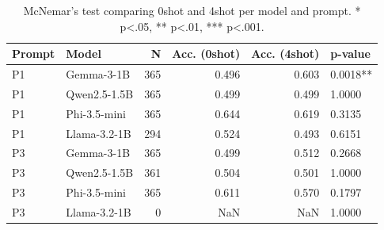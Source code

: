 \begin{table}
\caption{McNemar's test comparing 0shot and 4shot per model and prompt. * p<.05, ** p<.01, *** p<.001.}
\label{tab:mcnemar}
\begin{tabular}{llrrrl}
\toprule
Prompt & Model & N & Acc. (0shot) & Acc. (4shot) & p-value \\
\midrule
P1 & Gemma-3-1B & 365 & 0.496 & 0.603 & 0.0018** \\
P1 & Qwen2.5-1.5B & 365 & 0.499 & 0.499 & 1.0000 \\
P1 & Phi-3.5-mini & 365 & 0.644 & 0.619 & 0.3135 \\
P1 & Llama-3.2-1B & 294 & 0.524 & 0.493 & 0.6151 \\
P3 & Gemma-3-1B & 365 & 0.499 & 0.512 & 0.2668 \\
P3 & Qwen2.5-1.5B & 361 & 0.504 & 0.501 & 1.0000 \\
P3 & Phi-3.5-mini & 365 & 0.611 & 0.570 & 0.1797 \\
P3 & Llama-3.2-1B & 0 & NaN & NaN & 1.0000 \\
\bottomrule
\end{tabular}
\end{table}
